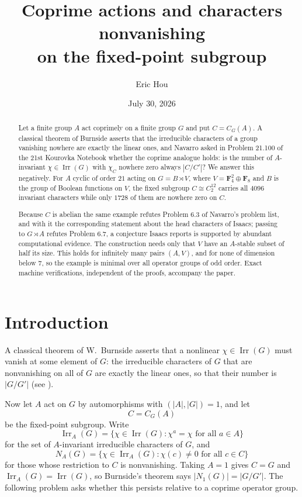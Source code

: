 \documentclass[11pt]{article}
\title{Coprime actions and characters nonvanishing\\
on the fixed-point subgroup}
\author{Eric Hou}
\date{July 30, 2026}
\theoremstyle{definition}
\theoremstyle{remark}
\newcommand{\F}{\mathbf F}
\newcommand{\Irr}{\operatorname{Irr}}
\begin{document}
\maketitle

\begin{abstract}
Let a finite group $A$ act coprimely on a finite group $G$ and put
$C=C_G(A)$.  A classical theorem of Burnside asserts that the irreducible
characters of a group vanishing nowhere are exactly the linear ones,
and Navarro asked
in Problem 21.100 of the 21st Kourovka Notebook whether the coprime
analogue holds: is the number of $A$-invariant $\chi\in\Irr(G)$ with
$\chi_C$ nowhere zero always $|C/C'|$?  We answer this negatively.  For
$A$ cyclic of order $21$ acting on $G=B\rtimes V$, where
$V=\F_4^2\oplus\F_8$ and $B$ is the group of Boolean functions on $V$,
the fixed subgroup $C\cong C_2^{12}$ carries all $4096$ invariant
characters while only $1728$ of them are nowhere zero on $C$.

Because $C$ is abelian the same example refutes Problem 6.3 of Navarro's
problem list, and with it the corresponding statement about the head
characters of Isaacs; passing to $G\rtimes A$ refutes Problem 6.7, a
conjecture Isaacs reports is supported by abundant computational
evidence.  The construction needs only that $V$ have an $A$-stable
subset of half its size.  This holds for infinitely many pairs $(A,V)$,
and for none of dimension below $7$, so the example is minimal over all
operator groups of odd order.  Exact machine verifications, independent
of the proofs, accompany the paper.
\end{abstract}

\section{Introduction}

A classical theorem of W.~Burnside asserts that a nonlinear
$\chi\in\Irr(G)$ must vanish at some element of $G$: the irreducible
characters of $G$ that are nonvanishing on all of $G$ are exactly the
linear ones, so that their number is $|G/G'|$ (see
\cite[Theorem 3.15]{isaacs-book}).

Now let $A$ act on $G$ by automorphisms with $(|A|,|G|)=1$, and let
\[
 C=C_G(A)
\]
be the fixed-point subgroup.  Write
\[
 \Irr_A(G)=\{\chi\in\Irr(G):\chi^a=\chi\text{ for all }a\in A\}
\]
for the set of $A$-invariant irreducible characters of $G$, and
\[
 N_A(G)=\{\chi\in\Irr_A(G):\chi(c)\neq0\text{ for all }c\in C\}
\]
for those whose restriction to $C$ is nonvanishing.  Taking $A=1$ gives
$C=G$ and $\Irr_A(G)=\Irr(G)$, so Burnside's theorem says
$|N_1(G)|=|G/G'|$.  The following problem asks whether this persists
relative to a coprime operator group.
\end{document}
